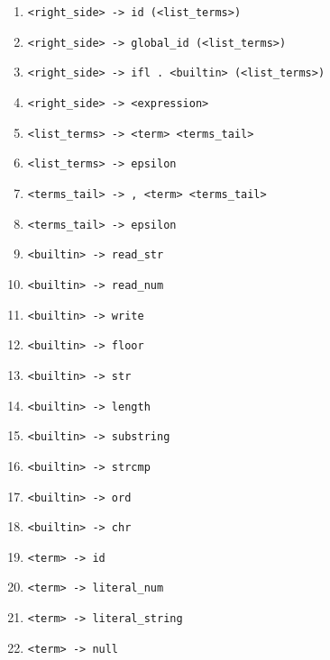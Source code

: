 \begin{enumerate}
    \item \verb|<right_side> -> id (<list_terms>)|
    \item \verb|<right_side> -> global_id (<list_terms>)|
    \item \verb|<right_side> -> ifl . <builtin> (<list_terms>)|
    \item \verb|<right_side> -> <expression>|
    \item \verb|<list_terms> -> <term> <terms_tail>|
    \item \verb|<list_terms> -> epsilon|
    \item \verb|<terms_tail> -> , <term> <terms_tail>|
    \item \verb|<terms_tail> -> epsilon|
    \item \verb|<builtin> -> read_str|
    \item \verb|<builtin> -> read_num|
    \item \verb|<builtin> -> write|
    \item \verb|<builtin> -> floor|
    \item \verb|<builtin> -> str|
    \item \verb|<builtin> -> length|
    \item \verb|<builtin> -> substring|
    \item \verb|<builtin> -> strcmp|
    \item \verb|<builtin> -> ord|
    \item \verb|<builtin> -> chr|
    \item \verb|<term> -> id|
    \item \verb|<term> -> literal_num|
    \item \verb|<term> -> literal_string|
    \item \verb|<term> -> null|

    
    
    
\end{enumerate}





